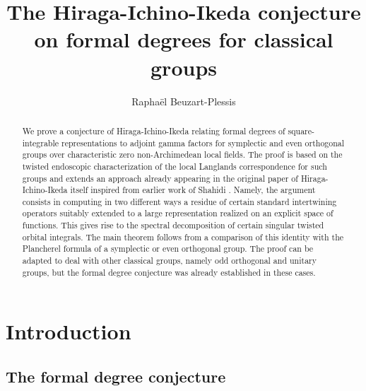 \documentclass[12pt]{article}
\title{The Hiraga-Ichino-Ikeda conjecture on formal degrees for classical groups}
\author{Rapha\"el Beuzart-Plessis}
\numberwithin{equation}{section}
\begin{document}
	
	\maketitle
	
	\begin{abstract}
		We prove a conjecture of Hiraga-Ichino-Ikeda relating formal degrees of square-integrable representations to adjoint gamma factors for symplectic and even orthogonal groups over characteristic zero non-Archimedean local fields. The proof is based on the twisted endoscopic characterization of the local Langlands correspondence for such groups and extends an approach already appearing in the original paper of Hiraga-Ichino-Ikeda \cite{HII} itself inspired from earlier work of Shahidi \cite{Shaend}. Namely, the argument consists in computing in two different ways a residue of certain standard intertwining operators suitably extended to a large representation realized on an explicit space of functions. This gives rise to the spectral decomposition of certain singular twisted orbital integrals. The main theorem follows from a comparison of this identity with the Plancherel formula of a symplectic or even orthogonal group. The proof can be adapted to deal with other classical groups, namely odd orthogonal and unitary groups, but the formal degree conjecture was already established in these cases. 
	\end{abstract}
	
\section{Introduction}

\subsection{The formal degree conjecture}
\end{document}
